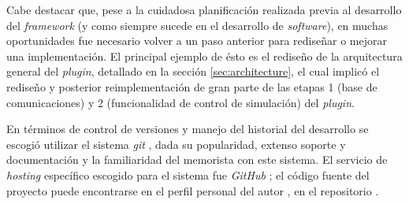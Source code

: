 Cabe destacar que, pese a la cuidadosa planificación realizada previa al desarrollo del \emph{framework} (y como siempre sucede en el desarrollo de \emph{software}), en muchas oportunidades fue necesario volver a un paso anterior para rediseñar o mejorar una implementación. El principal ejemplo de ésto es el rediseño de la arquitectura general del \emph{plugin}, detallado en la sección \ref{sec:architecture}, el cual implicó el rediseño y posterior reimplementación de gran parte de las etapas 1 (base de comunicaciones) y 2 (funcionalidad de control de simulación) del \emph{plugin}.

En términos de control de versiones y manejo del historial del desarrollo se escogió utilizar el sistema \emph{git} \autocite{git}, dada su popularidad, extenso soporte y documentación y la familiaridad del memorista con este sistema. El servicio de \emph{hosting} específico escogido para el sistema fue \emph{GitHub} \autocite{github}; el código fuente del proyecto puede encontrarse en el perfil personal del autor \autocite{molguin_github}, en el repositorio \autocite{pveins_github}.
